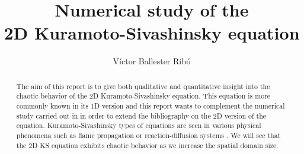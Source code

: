 \documentclass[twoside]{article}
\title{Numerical study of the\\2D Kuramoto-Sivashinsky equation}
\author{Víctor Ballester Ribó}
\date{\parbox{\linewidth}{\centering
Instabilities and Nonlinear Phenomena\endgraf
M2 - Applied and Theoretical Mathematics\endgraf
Université Paris-Dauphine, PSL\endgraf
\today}}
\begin{document}
\maketitle
\begin{abstract}
  The aim of this report is to give both qualitative and quantitative insight into the chaotic behavior of the 2D Kuramoto-Sivashinsky equation. This equation is more commonly known in its 1D version and this report wants to complement the numerical study carried out in \cite{Kalogirou2015} in order to extend the bibliography on the 2D version of the equation. Kuramoto-Sivashinsky types of equations are seen in various physical phenomena such as flame propagation or reaction-diffusion systems \cite{Kuramoto,Sivashinsky1977}. We will see that the 2D KS equation exhibits chaotic behavior as we increase the spatial domain size.
\end{abstract}
\end{document}
